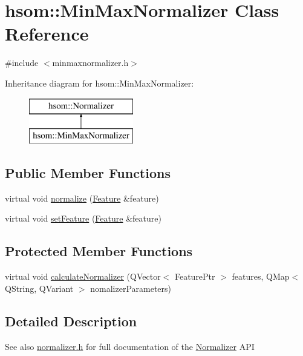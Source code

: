 \hypertarget{classhsom_1_1_min_max_normalizer}{\section{hsom\-:\-:\-Min\-Max\-Normalizer \-Class \-Reference}
\label{classhsom_1_1_min_max_normalizer}
}


{\ttfamily \#include $<$minmaxnormalizer.\-h$>$}

\-Inheritance diagram for hsom\-:\-:\-Min\-Max\-Normalizer\-:\begin{figure}[H]
\begin{center}
\leavevmode
\includegraphics[height=2.000000cm]{classhsom_1_1_min_max_normalizer}
\end{center}
\end{figure}
\subsection*{\-Public \-Member \-Functions}
\begin{DoxyCompactItemize}
\item 
virtual void \hyperlink{classhsom_1_1_min_max_normalizer_a9d7504876aadfb2dc473af23550fef39}{normalize} (\hyperlink{classhsom_1_1_feature}{\-Feature} \&feature)
\item 
virtual void \hyperlink{classhsom_1_1_min_max_normalizer_a659a9e0299dee946934b37f2b62720fc}{set\-Feature} (\hyperlink{classhsom_1_1_feature}{\-Feature} \&feature)
\end{DoxyCompactItemize}
\subsection*{\-Protected \-Member \-Functions}
\begin{DoxyCompactItemize}
\item 
virtual void \hyperlink{classhsom_1_1_min_max_normalizer_a767b6a382aa190053e41f4c664f6594d}{calculate\-Normalizer} (\-Q\-Vector$<$ \-Feature\-Ptr $>$ features, \-Q\-Map$<$ \-Q\-String, \-Q\-Variant $>$ nomalizer\-Parameters)
\end{DoxyCompactItemize}


\subsection{\-Detailed \-Description}
\begin{DoxySeeAlso}{\-See also}
\hyperlink{normalizer_8h_source}{normalizer.\-h} for full documentation of the \hyperlink{classhsom_1_1_normalizer}{\-Normalizer} \-A\-P\-I 
\end{DoxySeeAlso}



